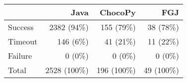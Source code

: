 \begin{tabular}{|l|r|r|r|}
  \hline
  &  Java  &  ChocoPy  &  FGJ  \\
  \hline
  \hline
  Success & 2382 (94\%) & 155 (79\%) & 38 (78\%) \\
  Timeout & 146 (6\%) & 41 (21\%) & 11 (22\%) \\
  Failure & 0 (0\%) & 0 (0\%) & 0 (0\%) \\
  \hline
  Total & 2528 (100\%) & 196 (100\%) & 49 (100\%) \\
  \hline
\end{tabular}